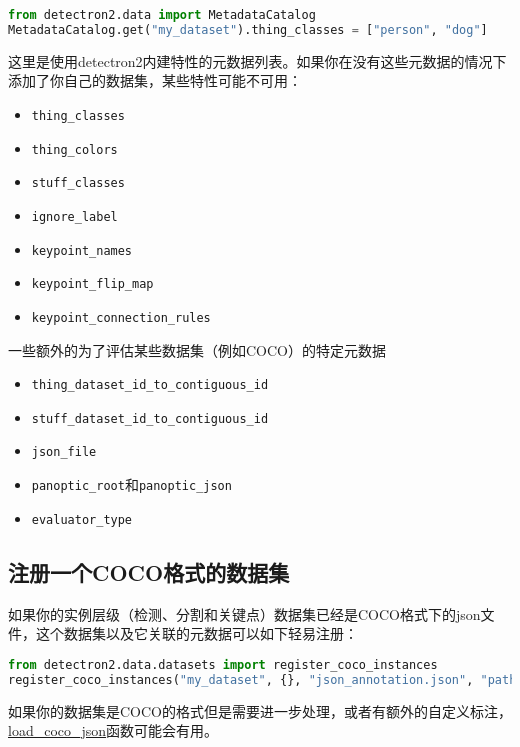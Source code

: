\documentclass[../main.tex]{subfile}
\begin{document}
\begin{lstlisting}[language=Python]
from detectron2.data import MetadataCatalog
MetadataCatalog.get("my_dataset").thing_classes = ["person", "dog"]
\end{lstlisting}

这里是使用detectron2内建特性的元数据列表。如果你在没有这些元数据的情况下添加了你自己的数据集，某些特性可能不可用：
\begin{itemize}
    \item \lstinline{thing_classes}
    \item \lstinline{thing_colors}
    \item \lstinline{stuff_classes}
    \item \lstinline{ignore_label}
    \item \lstinline{keypoint_names}
    \item \lstinline{keypoint_flip_map}
    \item \lstinline{keypoint_connection_rules}
\end{itemize}

一些额外的为了评估某些数据集（例如COCO）的特定元数据
\begin{itemize}
    \item \lstinline{thing_dataset_id_to_contiguous_id}
    \item \lstinline{stuff_dataset_id_to_contiguous_id}
    \item \lstinline{json_file}
    \item \lstinline{panoptic_root}和\lstinline{panoptic_json}
    \item \lstinline{evaluator_type}
\end{itemize}

\subsection{注册一个COCO格式的数据集}

如果你的实例层级（检测、分割和关键点）数据集已经是COCO格式下的json文件，这个数据集以及它关联的元数据可以如下轻易注册：
\begin{lstlisting}[language=Python]
from detectron2.data.datasets import register_coco_instances
register_coco_instances("my_dataset", {}, "json_annotation.json", "path/to/image/dir")
\end{lstlisting}
如果你的数据集是COCO的格式但是需要进一步处理，或者有额外的自定义标注，\href{https://detectron2.readthedocs.io/en/latest/modules/data.html#detectron2.data.datasets.load_coco_json}{load\_coco\_json}函数可能会有用。
\end{document}
